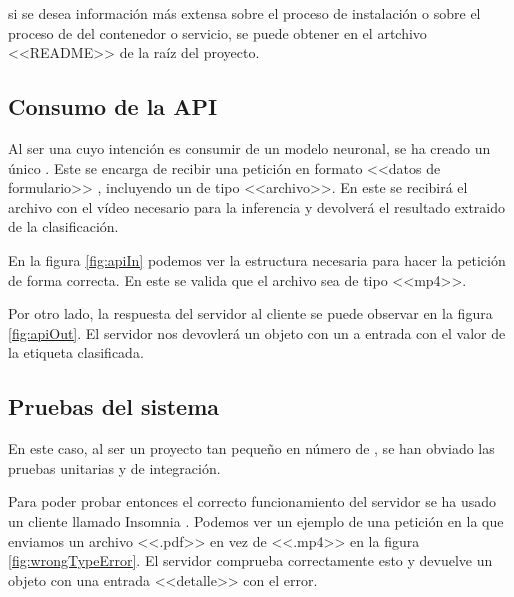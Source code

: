 si se desea información más extensa sobre el proceso de instalación o sobre el proceso de  del contenedor o servicio, se puede obtener en el artchivo <<README>> de la raíz del proyecto.

\subsection{Consumo de la API}

Al ser una  cuyo intención es consumir de un modelo neuronal, se ha creado un único . Este  se encarga de recibir una petición en formato <<datos de formulario>> , incluyendo un  de tipo <<archivo>>. En este  se recibirá el archivo con el vídeo necesario para la inferencia y devolverá el resultado extraido de la clasificación.

En la figura \ref{fig:apiIn} podemos ver la estructura necesaria para hacer la petición de forma correcta. En este  se valida que el archivo sea de tipo <<mp4>>.


Por otro lado, la respuesta del servidor al cliente se puede observar en la figura \ref{fig:apiOut}. El servidor nos devovlerá un objeto  con un a entrada con el valor de la etiqueta clasificada.




\subsection{Pruebas del sistema}

En este caso, al ser un proyecto tan pequeño en número de , se han obviado las pruebas unitarias y de integración.

Para poder probar entonces el correcto funcionamiento del servidor se ha usado un cliente  llamado Insomnia . Podemos ver un ejemplo de una petición en la que enviamos un archivo <<.pdf>> en vez de <<.mp4>> en la figura \ref{fig:wrongTypeError}. El servidor comprueba correctamente esto y devuelve un objeto  con una entrada <<detalle>> con el error.

